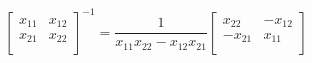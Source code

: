     \begin{center}
        \begin{equation*}
            \begin{bmatrix}
                x_{11} & x_{12} \\
                x_{21} & x_{22} \\
            \end{bmatrix}^{-1}
            = \frac{1}{x_{11}x_{22} - x_{12}x_{21}}
            \begin{bmatrix}
                x_{22} & -x_{12}  \\
                -x_{21} &  x_{11} \\
            \end{bmatrix}
        \end{equation*}
    \end{center}
